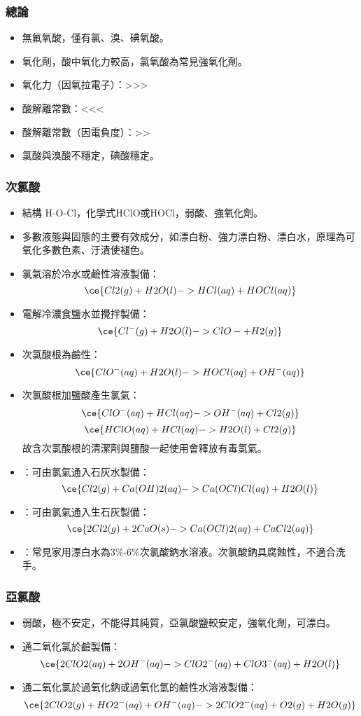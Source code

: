 \documentclass[a4paper,12pt]{report}
\begin{document}
\subsubsection{總論}
\begin{itemize}
\item 無氟氧酸，僅有氯、溴、碘氧酸。
\item 氧化劑，酸中氧化力較高，氯氧酸為常見強氧化劑。
\item 氧化力（因氧拉電子）：>>>
\item 酸解離常數：<<<
\item 酸解離常數（因電負度）：>>
\item 氯酸與溴酸不穩定，碘酸穩定。
\end{itemize}
\subsubsection{次氯酸}
\begin{itemize}
\item 結構 H-O-Cl，化學式HClO或HOCl，弱酸、強氧化劑。
\item 多數液態與固態的主要有效成分，如漂白粉、強力漂白粉、漂白水，原理為可氧化多數色素、汙漬使褪色。
\item 氯氣溶於冷水或鹼性溶液製備：
\[\ce{Cl2(g) + H2O(l) -> HCl(aq) + HOCl(aq)}\]
\item 電解冷濃食鹽水並攪拌製備：
\[\ce{Cl^-(g) + H2O(l) -> ClO- + H2(g)}\]
\item 次氯酸根為鹼性：
\[\ce{ClO^-(aq) + H2O(l) -> HOCl(aq) + OH^-(aq)}\]
\item 次氯酸根加鹽酸產生氯氣：
\[\ce{ClO^-(aq) + HCl(aq) -> OH^-(aq) + Cl2(g)}\]
\[\ce{HClO(aq) + HCl(aq) -> H2O(l) + Cl2(g)}\]
故含次氯酸根的清潔劑與鹽酸一起使用會釋放有毒氯氣。
\item {}：可由氯氣通入石灰水製備：
\[\ce{Cl2(g) + Ca(OH)2(aq) -> Ca(OCl)Cl(aq) + H2O(l)}\]
\item {}：可由氯氣通入生石灰製備：
\[\ce{2Cl2(g) + 2CaO(s) -> Ca(OCl)2(aq) + CaCl2(aq)}\]
\item {}：常見家用漂白水為3\%-6\%次氯酸鈉水溶液。次氯酸鈉具腐蝕性，不適合洗手。
\end{itemize}
\subsubsection{亞氯酸}
\begin{itemize}
\item 弱酸，極不安定，不能得其純質，亞氯酸鹽較安定，強氧化劑，可漂白。
\item 通二氧化氯於鹼製備：
\[\ce{2ClO2(aq) + 2OH^-(aq) -> ClO2^-(aq) + ClO3^-(aq) + H2O(l)}\]
\item 通二氧化氯於過氧化鈉或過氧化氫的鹼性水溶液製備：
\[\ce{2ClO2(g) + HO2^-(aq) + OH^-(aq) -> 2ClO2^-(aq) + O2(g) + H2O(g)}\]
\end{itemize}
\end{document}
